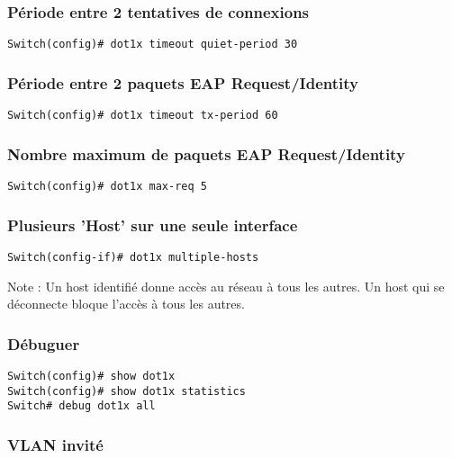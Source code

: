 \subsubsection{Période entre 2 tentatives de connexions}

\begin{verbatim}
Switch(config)# dot1x timeout quiet-period 30
\end{verbatim}

\subsubsection{Période entre 2 paquets EAP Request/Identity}

\begin{verbatim}
Switch(config)# dot1x timeout tx-period 60
\end{verbatim}

\subsubsection{Nombre maximum de paquets EAP Request/Identity}

\begin{verbatim}
Switch(config)# dot1x max-req 5
\end{verbatim}

\subsubsection{Plusieurs 'Host' sur une seule interface}

\begin{verbatim}
Switch(config-if)# dot1x multiple-hosts
\end{verbatim}

Note : Un host identifié donne accès au réseau à tous les autres. Un host qui se déconnecte bloque l'accès à tous les autres.

\subsubsection{Débuguer}

\begin{verbatim}
Switch(config)# show dot1x
Switch(config)# show dot1x statistics
Switch# debug dot1x all
\end{verbatim}

\subsubsection{VLAN invité}

